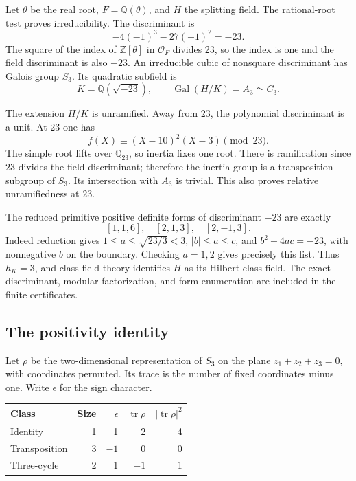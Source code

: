 \documentclass[11pt,letterpaper]{article}
\theoremstyle{definition}
\theoremstyle{remark}
\newcommand{\Q}{\mathbb Q}
\newcommand{\Z}{\mathbb Z}
\newcommand{\tr}{\operatorname{tr}}
\newcommand{\Gal}{\operatorname{Gal}}
\begin{document}
Let \(\theta\) be the real root, \(F=\Q(\theta)\), and \(H\) the
splitting field. The rational-root test proves irreducibility.
The discriminant is
\[
 -4(-1)^3-27(-1)^2=-23.
\]
The square of the index of \(\Z[\theta]\) in \(\mathcal O_F\) divides
23, so the index is one and the field discriminant is also \(-23\).
An irreducible cubic of nonsquare discriminant has Galois group \(S_3\).
Its quadratic subfield is
\[
 K=\Q(\sqrt{-23}),\qquad \Gal(H/K)=A_3\simeq C_3.
\]

The extension \(H/K\) is unramified. Away from \(23\), the polynomial
discriminant is a unit. At \(23\) one has
\[
 f(X)\equiv(X-10)^2(X-3)\pmod{23}.
\]
The simple root lifts over \(\Q_{23}\), so inertia fixes one root.
There is ramification since \(23\) divides the field discriminant;
therefore the inertia group is a transposition subgroup of \(S_3\).
Its intersection with \(A_3\) is trivial. This also proves relative
unramifiedness at \(23\).

The reduced primitive positive definite forms of discriminant \(-23\)
are exactly
\[
 [1,1,6],\quad[2,1,3],\quad[2,-1,3].
\]
Indeed reduction gives \(1\le a\le\sqrt{23/3}<3\),
\(|b|\le a\le c\), and \(b^2-4ac=-23\), with nonnegative \(b\) on
the boundary. Checking \(a=1,2\) gives precisely this list.
Thus \(h_K=3\), and class field theory identifies \(H\) as its
Hilbert class field. The exact discriminant, modular factorization,
and form enumeration are included in the finite certificates.

\subsection{The positivity identity}

Let \(\rho\) be the two-dimensional representation of \(S_3\) on
the plane \(z_1+z_2+z_3=0\), with coordinates permuted. Its trace
is the number of fixed coordinates minus one. Write \(\epsilon\)
for the sign character.

\begin{center}
\begin{tabular}{@{}lrrrr@{}}
\toprule
Class & Size & \(\epsilon\) & \(\tr\rho\) & \(|\tr\rho|^2\)\\
\midrule
Identity & 1 & 1 & 2 & 4\\
Transposition & 3 & \(-1\) & 0 & 0\\
Three-cycle & 2 & 1 & \(-1\) & 1\\
\bottomrule
\end{tabular}
\end{center}
\end{document}
